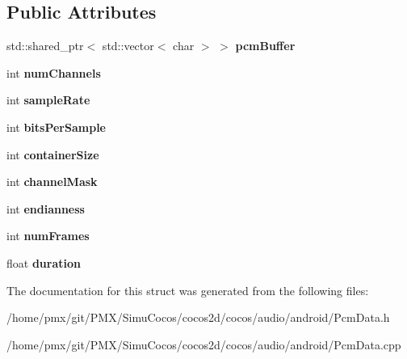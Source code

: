 \subsection*{Public Attributes}
\begin{DoxyCompactItemize}
\item 
\mbox{\label{structcocos2d_1_1experimental_1_1PcmData_a30786579a16b9251075c677d97bd0791}} 
std\+::shared\+\_\+ptr$<$ std\+::vector$<$ char $>$ $>$ {\bfseries pcm\+Buffer}
\item 
\mbox{\label{structcocos2d_1_1experimental_1_1PcmData_a7fb34a71770e99a342896c221ca95070}} 
int {\bfseries num\+Channels}
\item 
\mbox{\label{structcocos2d_1_1experimental_1_1PcmData_a495bc6aee59ef104710fc4bc6b28ab07}} 
int {\bfseries sample\+Rate}
\item 
\mbox{\label{structcocos2d_1_1experimental_1_1PcmData_a435a859b6767a2f5fb3fb711ee7dcd31}} 
int {\bfseries bits\+Per\+Sample}
\item 
\mbox{\label{structcocos2d_1_1experimental_1_1PcmData_a497e0bb41320ac0b769a320b84b2b75e}} 
int {\bfseries container\+Size}
\item 
\mbox{\label{structcocos2d_1_1experimental_1_1PcmData_a40885c6e4e81edc2999f976c37331b97}} 
int {\bfseries channel\+Mask}
\item 
\mbox{\label{structcocos2d_1_1experimental_1_1PcmData_acd2ba93b0d8b53d1236c43d471c2944e}} 
int {\bfseries endianness}
\item 
\mbox{\label{structcocos2d_1_1experimental_1_1PcmData_aecfff7ce9d51549898b41b1363d9e7a7}} 
int {\bfseries num\+Frames}
\item 
\mbox{\label{structcocos2d_1_1experimental_1_1PcmData_ab4bd90afcdf2a51e5b7d1820a17ce6dd}} 
float {\bfseries duration}
\end{DoxyCompactItemize}


The documentation for this struct was generated from the following files\+:\begin{DoxyCompactItemize}
\item 
/home/pmx/git/\+P\+M\+X/\+Simu\+Cocos/cocos2d/cocos/audio/android/Pcm\+Data.\+h\item 
/home/pmx/git/\+P\+M\+X/\+Simu\+Cocos/cocos2d/cocos/audio/android/Pcm\+Data.\+cpp\end{DoxyCompactItemize}
